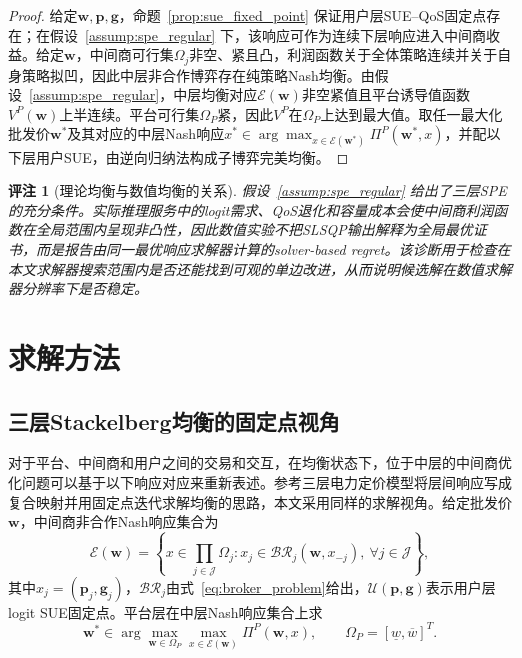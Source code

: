 \documentclass[UTF8,11pt]{ctexart}
\newtheorem{remark}{评注}
\newcommand{\J}{\mathcal{J}}
\newcommand{\w}{\boldsymbol{w}}
\newcommand{\p}{\boldsymbol{p}}
\newcommand{\g}{\boldsymbol{g}}
\begin{document}
\begin{proof}
给定$\w,\p,\g$，命题~\ref{prop:sue_fixed_point} 保证用户层SUE--QoS固定点存在；在假设~\ref{assump:spe_regular} 下，该响应可作为连续下层响应进入中间商收益。给定$\w$，中间商可行集$\Omega_j$非空、紧且凸，利润函数关于全体策略连续并关于自身策略拟凹，因此中层非合作博弈存在纯策略Nash均衡\cite{rosen1965existence,fudenberg1991game}。由假设~\ref{assump:spe_regular}，中层均衡对应$\mathcal{E}(\w)$非空紧值且平台诱导值函数$V^P(\w)$上半连续。平台可行集$\Omega_P$紧，因此$V^P$在$\Omega_P$上达到最大值。取任一最大化批发价$\w^*$及其对应的中层Nash响应$x^*\in\arg\max_{x\in\mathcal{E}(\w^*)}\Pi^P(\w^*,x)$，并配以下层用户SUE，由逆向归纳法构成子博弈完美均衡\cite{selten1965spieltheoretische,fudenberg1991game}。
\end{proof}

\begin{remark}[理论均衡与数值均衡的关系]
\label{rem:numerical_equilibrium_scope}
假设~\ref{assump:spe_regular} 给出了三层SPE的充分条件。实际推理服务中的logit需求、QoS退化和容量成本会使中间商利润函数在全局范围内呈现非凸性，因此数值实验不把SLSQP输出解释为全局最优证书，而是报告由同一最优响应求解器计算的solver-based regret。该诊断用于检查在本文求解器搜索范围内是否还能找到可观的单边改进，从而说明候选解在数值求解器分辨率下是否稳定。
\end{remark}

\section{求解方法}
\label{sec:solution}

\subsection{三层Stackelberg均衡的固定点视角}
\label{sec:fixed_point}

对于平台、中间商和用户之间的交易和交互，在均衡状态下，位于中层的中间商优化问题可以基于以下响应对应来重新表述。参考三层电力定价模型将层间响应写成复合映射并用固定点迭代求解均衡的思路\cite{wang2026hierarchical}，本文采用同样的求解视角。给定批发价$\w$，中间商非合作Nash响应集合为
\begin{equation}
  \mathcal{E}(\w)=
  \left\{
  x\in\prod_{j\in\J}\Omega_j:
  x_j\in\mathcal{BR}_j(\w,x_{-j}),\ \forall j\in\J
  \right\},
  \label{eq:broker_mapping}
\end{equation}
其中$x_j=(\p_j,\g_j)$，$\mathcal{BR}_j$由式~\eqref{eq:broker_problem}给出，$\mathcal{U}(\p,\g)$表示用户层logit SUE固定点。平台层在中层Nash响应集合上求
\begin{equation}
  \w^*\in
  \arg\max_{\w\in\Omega_P}\max_{x\in\mathcal{E}(\w)}\Pi^P(\w,x),
  \qquad
  \Omega_P=[\underline w,\overline w]^T .
  \label{eq:platform_mapping}
\end{equation}
\end{document}
